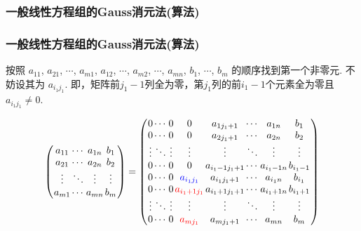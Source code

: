 \subsubsection{一般线性方程组的Gauss消元法(算法)}
\begin{frame}\frametitle{一般线性方程组的Gauss消元法(算法)}
按照 $a_{11}$, $a_{21}$, $\cdots$, $a_{m1}$, $a_{12}$, $\cdots$, $a_{m2}$, $\cdots$, $a_{mn}$, $b_1$, $\cdots$, $b_m$ 的顺序找到第一个非零元. 不妨设其为 $a_{i_1j_1}$. \pp 即，矩阵前$j_1-1$列全为零，第$j_1$列的前$i_1-1$个元素全为零且 $a_{i_1j_1}\neq0$.

\bigskip

\begin{equation*}
\setlength{\arraycolsep}{0.7pt}
\left(\begin{array}{ccccc}
a_{11} & \cdots & a_{1n} & b_1 \\
a_{21} & \cdots & a_{2n} & b_2 \\
\vdots &  \ddots & \vdots & \vdots\\
a_{m1} & \cdots & a_{mn} & b_m \\
\end{array}\right) =
\left(\begin{array}{cccccccc}
0 & \cdots &0 & 0 & a_{1j_1+1} & \cdots & a_{1n} & b_{1} \\
0 & \cdots &0 & 0 &a_{2j_1+1} & \cdots & a_{2n} & b_{2} \\
\vdots &\ddots &\vdots &\vdots &\vdots &\ddots &\vdots &\vdots \\
0 & \cdots &0 & 0 & a_{i_1-1j_1+1} & \cdots & a_{i_1-1n} & b_{i_1-1} \\
0 & \cdots &0 & \blue{a_{i_1j_1}} & a_{i_1j_1+1} & \cdots & a_{i_1n} & b_{i_1} \\
0 & \cdots &0 & \red{a_{i_1+1j_1}} & a_{i_1+1j_1+1} & \cdots & a_{i_1+1n} & b_{i_1+1} \\
\vdots &\ddots &\vdots &\vdots &\vdots &\ddots &\vdots &\vdots \\
0 & \cdots &0 & \red{a_{mj_1}} & a_{mj_1+1} & \cdots & a_{mn} & b_{m} \\
\end{array}\right)
\end{equation*}

\end{frame}





